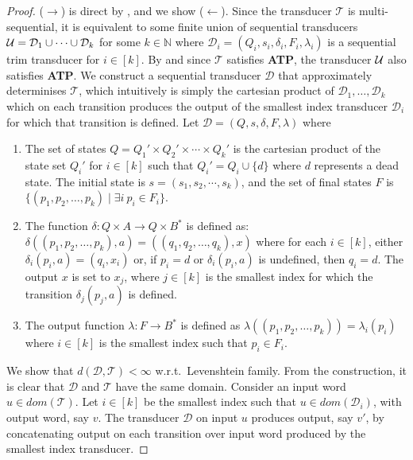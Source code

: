 \documentclass[a4paper,UKenglish,cleveref, autoref, thm-restate,authorcolumns, colorlinks]{lipics-v2021}
\newcommand\dom{\mathit{dom}}
\newcommand\calD{\mathcal{D}}
\newcommand\calT{\mathcal{T}}
\newcommand{\ATP}[0]{\textbf{ATP}}
\begin{document}
{\begin{proof}
    ($\rightarrow$) is direct by , and we show ($\leftarrow$). Since the transducer $\calT$ is multi-sequential, it is equivalent to some finite union of sequential transducers ${\cal U} = \calD_1 \cup \cdots \cup \calD_k$ for some $k\in \mathbb{N}$ where $\calD_i = (Q_i,s_i,\delta_i,F_i,\lambda_i)$ is a sequential trim transducer for $i \in [k]$. By  and since $\calT$ satisfies \ATP{}, the transducer ${\cal U}$ also satisfies \ATP{}.    
    We construct a sequential transducer $\calD$ that approximately determinises $\calT$, which intuitively is simply the cartesian product of $\calD_1, \ldots, \calD_k$ which on each transition produces the output of the smallest index transducer $\calD_i$ for which that transition is defined.
    Let $\calD = (Q,s,\delta,F,\lambda)$  where
    \begin{enumerate}
        \item The set of states $Q = Q_1' \times Q_2' \times \cdots \times Q_k'$ is the cartesian product of the state set $Q_i'$ for $i \in [k]$ such that $Q_i'= Q_i \cup \{d\}$ where $d$ represents a dead state. The initial state is $s = (s_1,s_2,\cdots,s_k)$, and the set of final states $F$ is $\{(p_1, p_2, \ldots, p_k) \mid \exists i \  p_i \in F_i \}$.
 
        \item The function $\delta : Q \times A \rightarrow Q \times B^*$ is defined as: $\delta((p_1,p_2,\ldots,p_k),a)=((q_1,q_2,\ldots, q_k),x)$ where 
        for each $i \in [k]$, either $\delta_i(p_i,a) = (q_i,x_i)$ or, if $p_i = d$ or $\delta_i(p_i,a)$ is undefined, then $q_i = d$. The output $x$ is set to $x_j$, where $j \in [k]$ is the smallest index for which the transition $\delta_j(p_j,a)$ is defined.

        \item The output function $\lambda: F \rightarrow B^*$ is defined as $\lambda((p_1, p_2, \ldots, p_k))=\lambda_i(p_i)$ where $i \in [k]$ is the smallest index such that $p_i \in F_i$.
    \end{enumerate}
 
    We show that $d(\calD,\calT) < \infty$ w.r.t.~Levenshtein family. From the construction, it is clear that $\calD$ and $\calT$ have the same domain. Consider an input word $u\in\dom(\calT)$. 
    Let $i\in[k]$ be the smallest index such that $u\in\dom(\calD_i)$, with output word, say $v$. The transducer $\calD$ on input $u$ produces output, say $v'$, by concatenating output on each transition over input word produced by the smallest index transducer.
    

\end{proof}}
\end{document}
